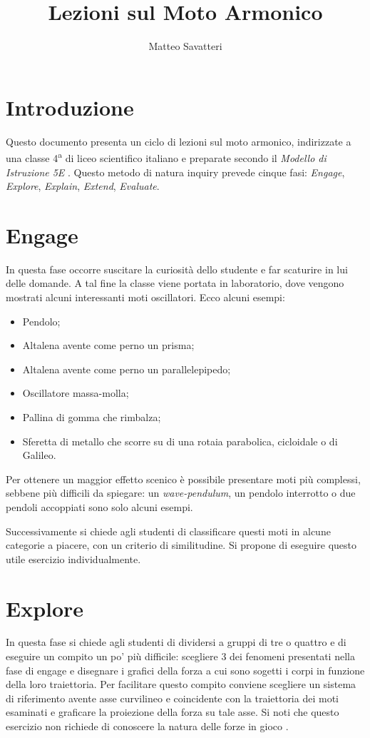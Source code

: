 \documentclass{article}
\title{Lezioni sul Moto Armonico}
\author{Matteo Savatteri}
\begin{document}
\maketitle

\tableofcontents

\section{Introduzione}
Questo documento presenta un ciclo di lezioni sul moto
armonico, indirizzate a una classe 4\textsuperscript{a}
di liceo scientifico italiano e preparate secondo il
\emph{Modello di Istruzione 5E} \cite{bybee2009bscs}.
Questo metodo di natura inquiry prevede cinque fasi:
\emph{Engage}, \emph{Explore},
\emph{Explain}, \emph{Extend}, \emph{Evaluate}.

\section{Engage}
In questa fase occorre suscitare la curiosità dello
studente e far scaturire in lui delle domande.
A tal fine la classe viene portata in laboratorio,
dove vengono mostrati alcuni interessanti moti
oscillatori. Ecco alcuni esempi: 
\begin{itemize}
\item Pendolo;
\item Altalena avente come perno un prisma;
\item Altalena avente come perno un parallelepipedo;
\item Oscillatore massa-molla;
\item Pallina di gomma che rimbalza;
\item Sferetta di metallo che scorre su di una rotaia
parabolica, cicloidale o di Galileo.
\end{itemize}

Per ottenere un maggior effetto scenico è possibile
presentare moti più complessi, sebbene più difficili
da spiegare: un \emph{wave-pendulum}, un pendolo
interrotto o due pendoli accoppiati sono solo alcuni
esempi.

Successivamente si chiede agli studenti di classificare
questi moti in alcune categorie a piacere, con un criterio di
similitudine. Si propone di eseguire questo utile esercizio
individualmente.

\section{Explore}
In questa fase si chiede agli studenti di dividersi a gruppi di tre
o quattro e di eseguire un compito un po' più difficile: scegliere
3 dei fenomeni presentati nella fase di engage e disegnare i
grafici della forza a cui sono sogetti i corpi in funzione della
loro traiettoria. Per facilitare questo compito conviene
scegliere un sistema di riferimento avente asse curvilineo
e coincidente con la traiettoria dei moti esaminati e graficare
la proiezione della forza su tale asse. Si noti che questo
esercizio non richiede di conoscere la natura delle forze in
gioco \cite{barbieri2015good}.
\end{document}
